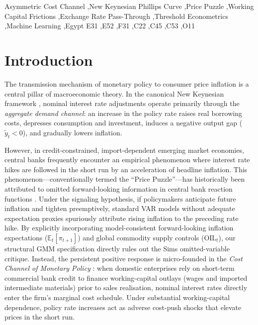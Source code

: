 \documentclass[review,12pt]{elsarticle}
\begin{document}
\begin{frontmatter}
\begin{keyword}
Asymmetric Cost Channel \sep New Keynesian Phillips Curve \sep Price Puzzle
\sep Working Capital Frictions \sep Exchange Rate Pass-Through \sep Threshold
Econometrics \sep Machine Learning \sep Egypt
\JEL E31 \sep E52 \sep F31 \sep C22 \sep C45 \sep C53 \sep O11
\end{keyword}

\end{frontmatter}

\section{Introduction}
\label{sec:intro}

The transmission mechanism of monetary policy to consumer price inflation is a
central pillar of macroeconomic theory. In the canonical New Keynesian framework
\citep{clarida1999, woodford2003, gali2008}, nominal interest rate adjustments operate
primarily through the \textit{aggregate demand channel}: an increase in the policy
rate raises real borrowing costs, depresses consumption and investment, induces a
negative output gap ($\tilde{y}_t < 0$), and gradually lowers inflation.

However, in credit-constrained, import-dependent emerging market economies, central
banks frequently encounter an empirical phenomenon where interest rate hikes are
followed in the short run by an acceleration of headline inflation. This phenomenon---conventionally termed the ``Price Puzzle''---has historically been attributed to omitted forward-looking information in central bank reaction functions \citep{sims1992, bernanke1998}. Under the \citet{sims1992} signaling hypothesis, if policymakers anticipate future inflation and tighten preemptively, standard VAR models without adequate expectation proxies spuriously attribute rising inflation to the preceding rate hike. By explicitly incorporating model-consistent forward-looking inflation expectations ($\mathbb{E}_t[\pi_{t+1}]$) and global commodity supply controls ($\text{OIL}_t$), our structural GMM specification directly rules out the Sims omitted-variable critique. Instead, the persistent positive response is micro-founded in the \textit{Cost Channel of Monetary Policy} \citep{barth2001, ravenna2006, chowdhury2006}:
when domestic enterprises rely on short-term commercial bank credit to finance working-capital
outlays (wages and imported intermediate materials) prior to sales realisation, nominal
interest rates directly enter the firm's marginal cost schedule. Under substantial working-capital
dependence, policy rate increases act as adverse cost-push shocks that elevate prices in the short run.
\end{document}
